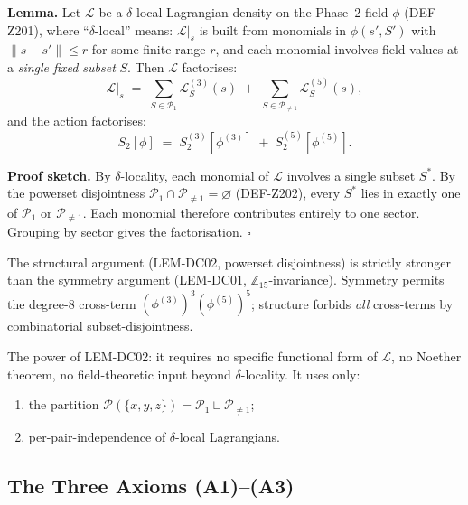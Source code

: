 \documentclass[12pt, a4paper]{article}
\begin{document}
\begin{formalbox}[title={LEM-DC02: Powerset Orthogonality
  (the Structural Argument)}]
\textbf{Lemma.} Let $\mathcal{L}$ be a $\delta$-local Lagrangian
density on the Phase~2 field $\phi$ (DEF-Z201), where ``$\delta$-local''
means: $\mathcal{L}|_s$ is built from monomials in $\phi(s', S')$ with
$\|s - s'\| \le r$ for some finite range $r$, and each monomial
involves field values at a \emph{single fixed subset} $S$. Then
$\mathcal{L}$ factorises:
\begin{equation}
  \mathcal{L}\big|_s
  \;=\;
  \sum_{S \in \mathcal{P}_1} \mathcal{L}^{(3)}_S(s)
  \;+\;
  \sum_{S \in \mathcal{P}_{\ne 1}} \mathcal{L}^{(5)}_S(s),
  \label{eq:LEM-DC02}
\end{equation}
and the action factorises:
\begin{equation}
  S_2[\phi] \;=\; S_2^{(3)}[\phi^{(3)}] \;+\; S_2^{(5)}[\phi^{(5)}].
\end{equation}

\textbf{Proof sketch.} By $\delta$-locality, each monomial of
$\mathcal{L}$ involves a single subset $S^*$. By the powerset
disjointness $\mathcal{P}_1 \cap \mathcal{P}_{\ne 1} = \varnothing$
(DEF-Z202), every $S^*$ lies in exactly one of $\mathcal{P}_1$ or
$\mathcal{P}_{\ne 1}$. Each monomial therefore contributes entirely
to one sector. Grouping by sector gives the factorisation. \hfill$\square$
\end{formalbox}

\begin{keybox}[title={Structure $>$ Symmetry: The Sharper Constraint}]
The structural argument (LEM-DC02, powerset disjointness) is
strictly stronger than the symmetry argument (LEM-DC01,
$\mathbb{Z}_{15}$-invariance). Symmetry permits the degree-8
cross-term $(\phi^{(3)})^3(\phi^{(5)})^5$; structure forbids
\emph{all} cross-terms by combinatorial subset-disjointness.

The power of LEM-DC02: it requires no specific functional form of
$\mathcal{L}$, no Noether theorem, no field-theoretic input beyond
$\delta$-locality. It uses only:
\begin{enumerate}[leftmargin=*]
\item the partition $\mathcal{P}(\{x,y,z\}) = \mathcal{P}_1 \sqcup
  \mathcal{P}_{\ne 1}$;
\item per-pair-independence of $\delta$-local Lagrangians.
\end{enumerate}
\end{keybox}

\subsection{The Three Axioms (A1)--(A3)}
\end{document}
